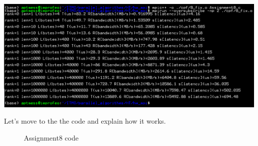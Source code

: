 \documentclass[%
12pt, %
final, %
oneside, %
onecolumn, %
centertags]{article} %
\theoremstyle{plain}
\theoremstyle{definition}
\theoremstyle{remark}
\begin{document}
\begin{center}
\includegraphics[scale=0.5]{8.3.png}
\end{center}

Let's move to the the code and explain how it works.

\begin{figure}[h!]
\centering
{} 

Assignment8 code
\end{figure}
\end{document}
